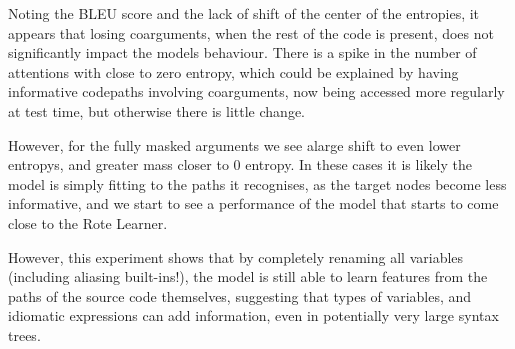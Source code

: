 Noting the BLEU score and the lack of shift of the center of the entropies, it appears that losing coarguments, when the rest of the code is present, does not significantly impact the models behaviour.
There is a spike in the number of attentions with close to zero entropy, which could be explained by having informative codepaths involving coarguments, now being accessed more regularly at test time, but otherwise there is little change.

However, for the fully masked arguments we see alarge shift to even lower entropys, and greater mass closer to 0 entropy. In these cases it is likely the model is simply fitting to the paths it recognises, as the target nodes become less informative, and we start to see a performance of the model that starts to come close to the Rote Learner.

However, this experiment shows that by completely renaming all variables (including aliasing built-ins!), the model is still able to learn features from the paths of the source code themselves, suggesting that types of variables, and idiomatic expressions can add information, even in potentially very large syntax trees.


